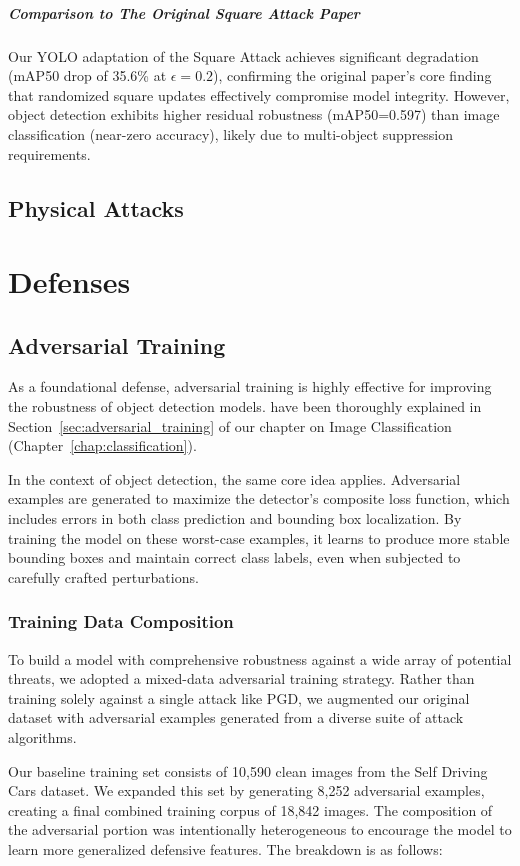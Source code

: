 \documentclass[../main.tex]{subfiles}
\begin{document}
\subparagraph{Comparison to The Original Square Attack Paper}
Our YOLO adaptation of the Square Attack achieves significant degradation (mAP50 drop of 35.6\% at $\epsilon=0.2$), confirming the original paper's core finding that randomized square updates effectively compromise model integrity\cite{andriushchenko2020square}. However, object detection exhibits higher residual robustness (mAP50=0.597) than image classification (near-zero accuracy)\cite{andriushchenko2020square}, likely due to multi-object suppression requirements.



\subsection{Physical Attacks}

\section{Defenses}
\subsection{Adversarial Training}
As a foundational defense, adversarial training is highly effective for improving the robustness of object detection models. have been thoroughly explained in Section~\ref{sec:adversarial_training} of our chapter on Image Classification (Chapter~\ref{chap:classification}).

In the context of object detection, the same core idea applies. Adversarial examples are generated to maximize the detector's composite loss function, which includes errors in both class prediction and bounding box localization. By training the model on these worst-case examples, it learns to produce more stable bounding boxes and maintain correct class labels, even when subjected to carefully crafted perturbations.

\subsubsection{Training Data Composition}
To build a model with comprehensive robustness against a wide array of potential threats, we adopted a mixed-data adversarial training strategy. Rather than training solely against a single attack like PGD, we augmented our original dataset with adversarial examples generated from a diverse suite of attack algorithms.

Our baseline training set consists of 10,590 clean images from the Self Driving Cars dataset. We expanded this set by generating 8,252 adversarial examples, creating a final combined training corpus of 18,842 images. The composition of the adversarial portion was intentionally heterogeneous to encourage the model to learn more generalized defensive features. The breakdown is as follows:
\end{document}
